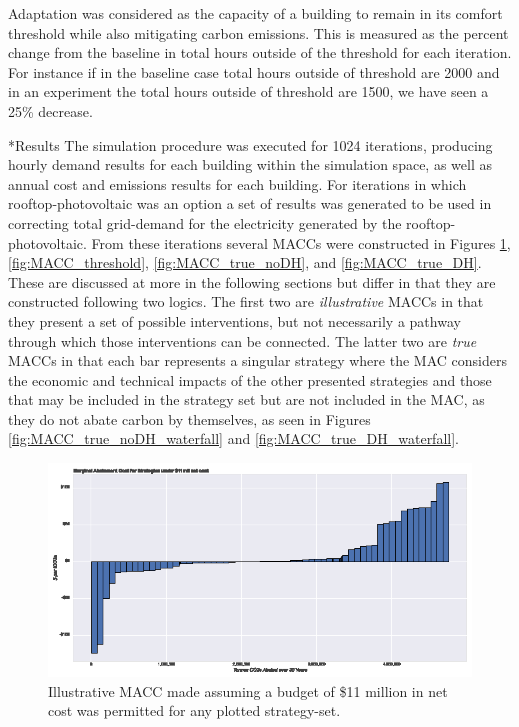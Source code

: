 \documentclass[twocolumn, a4paper,10pt]{article}
\makeatletter
\renewcommand\section{\@startsection{section}{1}{\z@}{3pt}{3pt}{\normalfont\large\bfseries}}
\makeatother
\begin{document}
Adaptation was considered as the capacity of a building to remain in its comfort threshold while also mitigating carbon emissions. This is measured as the percent change from the baseline in total hours outside of the threshold for each iteration. For instance if in the baseline case total hours outside of threshold are 2000 and in an experiment the total hours outside of threshold are 1500, we have seen a 25\% decrease. 

\section*{Results}
The simulation procedure was executed for 1024 iterations, producing hourly demand results for each building within the simulation space, as well as annual cost and emissions results for each building. For iterations in which rooftop-photovoltaic was an option a set of results was generated to be used in correcting total grid-demand for the electricity generated by the rooftop-photovoltaic. From these iterations several MACCs were constructed in Figures \ref{fig:MACC_budget}, \ref{fig:MACC_threshold}, \ref{fig:MACC_true_noDH}, and \ref{fig:MACC_true_DH}. These are discussed at more in the following sections but differ in that they are constructed following two logics. The first two are \textit{illustrative} MACCs in that they present a set of possible interventions, but not necessarily a pathway through which those interventions can be connected. The latter two are \textit{true} MACCs in that each bar represents a singular strategy where the MAC considers the economic and technical impacts of the other presented strategies and those that may be included in the strategy set but are not included in the MAC, as they do not abate carbon by themselves, as seen in Figures \ref{fig:MACC_true_noDH_waterfall} and \ref{fig:MACC_true_DH_waterfall}. 

\begin{figure}[hbpt]
    \centering
    \includegraphics[scale=1]{figures/budget_macc.eps}
    \caption{Illustrative MACC made assuming a budget of \$11 million in net cost was permitted for any plotted strategy-set.}
    \label{fig:MACC_budget}
\end{figure}
\end{document}
